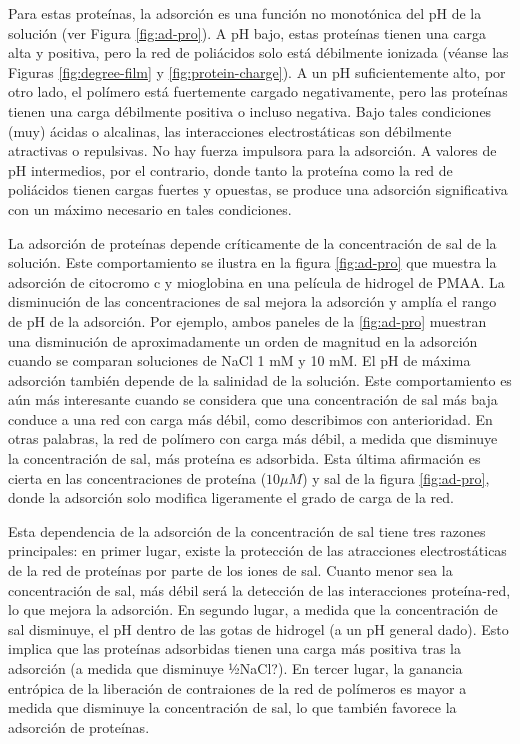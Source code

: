 Para estas proteínas, la adsorción es una función no monotónica del pH de la solución (ver Figura \ref{fig:ad-pro}). A pH bajo, estas proteínas tienen una carga alta y positiva, pero la red de poliácidos solo está débilmente ionizada (véanse las Figuras \ref{fig:degree-film} y \ref{fig:protein-charge}). A un pH suficientemente alto, por otro lado, el polímero está fuertemente cargado negativamente, pero las proteínas tienen una carga débilmente positiva o incluso negativa. Bajo tales condiciones (muy) ácidas o alcalinas, las interacciones electrostáticas son débilmente atractivas o repulsivas. No hay fuerza impulsora para la adsorción. A valores de pH intermedios, por el contrario, donde tanto la proteína como la red de poliácidos tienen cargas fuertes y opuestas, se produce una adsorción significativa con un máximo necesario en tales condiciones.

La adsorción de proteínas depende críticamente de la concentración de sal de la solución. Este comportamiento se ilustra en la figura \ref{fig:ad-pro} que muestra la adsorción de citocromo c  y mioglobina en una película de hidrogel de PMAA. La disminución de las concentraciones de sal mejora la adsorción y amplía el rango de pH de la adsorción. Por ejemplo, ambos paneles de la \ref{fig:ad-pro} muestran una disminución de aproximadamente un orden de magnitud en la adsorción cuando se comparan soluciones de NaCl 1 mM y 10 mM. El pH de máxima adsorción también depende de la salinidad de la solución. Este comportamiento es aún más interesante cuando se considera que una concentración de sal más baja conduce a una red con carga más débil, como describimos con anterioridad. En otras palabras, la red de polímero con carga más débil, a medida que disminuye la concentración de sal, más proteína es adsorbida. Esta última afirmación es cierta en las concentraciones de proteína ($10 \mu M$) y sal de la figura \ref{fig:ad-pro}, donde la adsorción solo modifica ligeramente el grado de carga de la red.

Esta dependencia de la adsorción de la concentración de sal tiene tres razones principales: en primer lugar, existe la protección de las atracciones electrostáticas de la red de proteínas por parte de los iones de sal. Cuanto menor sea la concentración de sal, más débil será la detección de las interacciones proteína-red, lo que mejora la adsorción. En segundo lugar, a medida que la concentración de sal disminuye, el pH dentro de las gotas de hidrogel (a un pH general dado). Esto implica que las proteínas adsorbidas tienen una carga más positiva tras la adsorción (a medida que disminuye ½NaCl?). En tercer lugar, la ganancia entrópica de la liberación de contraiones de la red de polímeros es mayor a medida que disminuye la concentración de sal, lo que también favorece la adsorción de proteínas.



